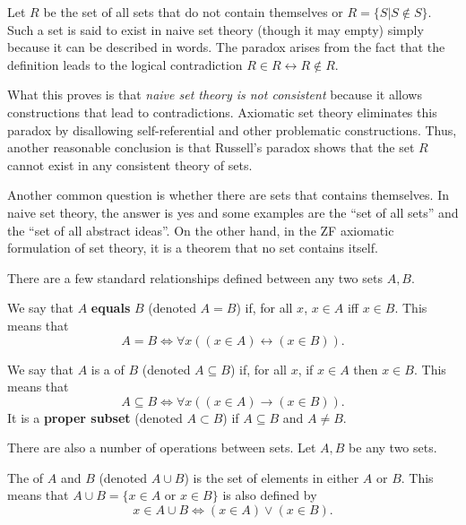 \begin{example}
Let $R$ be the set of all sets that do not contain themselves or $R = \{S|S\notin S\}$.
Such a set is said to exist in naive set theory (though it may empty) simply because it can be described in words.
The paradox arises from the fact that the definition leads to the logical contradiction $R\in R \leftrightarrow R\notin R$.
\end{example}

What this proves is that \emph{naive set theory is not consistent} because it allows constructions that lead to contradictions.
Axiomatic set theory eliminates this paradox by disallowing self-referential and other problematic constructions.
Thus, another reasonable conclusion is that Russell's paradox shows that the set $R$ cannot exist in any consistent theory of sets.

Another common question is whether there are sets that contains themselves.
In naive set theory, the answer is yes and some examples are the ``set of all sets'' and the ``set of all abstract ideas''.
On the other hand, in the ZF axiomatic formulation of set theory, it is a theorem that no set contains itself.

There are a few standard relationships defined between any two sets $A,B$.
\begin{definition}
We say that $A$ \textbf{equals} $B$ (denoted $A=B$) if, for all $x$,  $x\in A$ iff $x\in B$.
This means that
\[ A=B \Leftrightarrow \forall x \left( (x\in A)\leftrightarrow (x\in B) \right). \]
\end{definition}

\begin{definition}
We say that $A$ is a  of $B$ (denoted $A\subseteq B$) if, for all $x$, if $x\in A$ then $x\in B$.
This means that
\[ A\subseteq B  \Leftrightarrow \forall x \left( (x\in A)\rightarrow (x\in B) \right). \]
It is a \textbf{proper subset} (denoted $A\subset B$) if $A\subseteq B$ and $A\neq B$.
\end{definition}

There are also a number of operations between sets.
Let $A,B$ be any two sets.
\begin{definition}
The  of $A$ and $B$ (denoted $A\cup B$) is the set of elements in either $A$ or $B$.
This means that $A \cup B = \{ x\in A \textrm{ or } x\in B \}$ is also defined by
\[ x\in A\cup B \Leftrightarrow (x\in A)\vee (x\in B). \]
\end{definition}

